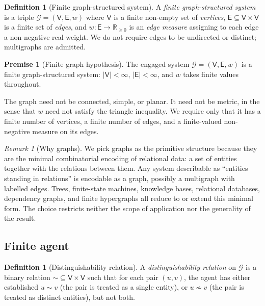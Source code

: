 \documentclass[11pt,twocolumn,a4paper]{article}
\theoremstyle{thmstyle}
\theoremstyle{definition}
\newtheorem{definition}[theorem]{Definition}
\newtheorem{axiom}{Premise}
\theoremstyle{remark}
\newtheorem{remark}[theorem]{Remark}
\newcommand{\R}{\mathbb{R}}
\newcommand{\Graph}{\mathcal{G}}
\newcommand{\Vrt}{\mathsf{V}}
\newcommand{\Edg}{\mathsf{E}}
\begin{document}
\begin{definition}[Finite graph-structured system]
\label{def:graph}
A \emph{finite graph-structured system} is a triple $\Graph =
(\Vrt, \Edg, w)$ where $\Vrt$ is a finite non-empty set of
\emph{vertices}, $\Edg \subseteq \Vrt \times \Vrt$ is a finite set
of \emph{edges}, and $w: \Edg \to \R_{\geq 0}$ is an \emph{edge
measure} assigning to each edge a non-negative real weight. We do
not require edges to be undirected or distinct; multigraphs are
admitted.
\end{definition}

\begin{axiom}[Finite graph hypothesis]
\label{ax:graph}
The engaged system $\Graph = (\Vrt, \Edg, w)$ is a finite
graph-structured system: $|\Vrt| < \infty$, $|\Edg| < \infty$, and
$w$ takes finite values throughout.
\end{axiom}

The graph need not be connected, simple, or planar. It need not be
metric, in the sense that $w$ need not satisfy the triangle
inequality. We require only that it has a finite number of
vertices, a finite number of edges, and a finite-valued non-negative
measure on its edges.

\begin{remark}[Why graphs]
\label{rem:why_graphs}
We pick graphs as the primitive structure because they are the
minimal combinatorial encoding of relational data: a set of entities
together with the relations between them. Any system describable as
``entities standing in relations'' is encodable as a graph, possibly
a multigraph with labelled edges. Trees, finite-state machines,
knowledge bases, relational databases, dependency graphs, and finite
hypergraphs all reduce to or extend this minimal form. The choice
restricts neither the scope of application nor the generality of the
result.
\end{remark}

\subsection{Finite agent}

\begin{definition}[Distinguishability relation]
\label{def:distrel}
A \emph{distinguishability relation} on $\Graph$ is a binary
relation $\sim \subseteq \Vrt \times \Vrt$ such that for each pair
$(u, v)$, the agent has either established $u \sim v$ (the pair is
treated as a single entity), or $u \not\sim v$ (the pair is treated
as distinct entities), but not both.
\end{definition}
\end{document}
